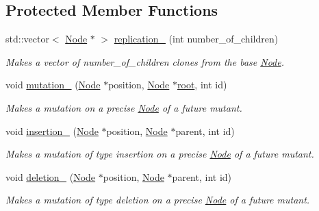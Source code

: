 \subsection*{Protected Member Functions}
\begin{DoxyCompactItemize}
\item 
\mbox{\label{classEvolution_aac3850387f35657c75c6deaf1e711538}} 
std\+::vector$<$ \hyperlink{classNode}{Node} $\ast$ $>$ \hyperlink{classEvolution_aac3850387f35657c75c6deaf1e711538}{replication\+\_\+} (int number\+\_\+of\+\_\+children)
\begin{DoxyCompactList}\small\item\em Makes a vector of number\+\_\+of\+\_\+children clones from the base \hyperlink{classNode}{Node}. \end{DoxyCompactList}\item 
\mbox{\label{classEvolution_ae4ec9688c4d948d9c31f29069804b0b0}} 
void \hyperlink{classEvolution_ae4ec9688c4d948d9c31f29069804b0b0}{mutation\+\_\+} (\hyperlink{classNode}{Node} $\ast$position, \hyperlink{classNode}{Node} $\ast$\hyperlink{classEvolution_a83182c1db463268e933cc0ca9c46d056}{root}, int id)
\begin{DoxyCompactList}\small\item\em Makes a mutation on a precise \hyperlink{classNode}{Node} of a future mutant. \end{DoxyCompactList}\item 
\mbox{\label{classEvolution_a436adadb0c98f7c12ae7be370b030a27}} 
void \hyperlink{classEvolution_a436adadb0c98f7c12ae7be370b030a27}{insertion\+\_\+} (\hyperlink{classNode}{Node} $\ast$position, \hyperlink{classNode}{Node} $\ast$parent, int id)
\begin{DoxyCompactList}\small\item\em Makes a mutation of type insertion on a precise \hyperlink{classNode}{Node} of a future mutant. \end{DoxyCompactList}\item 
\mbox{\label{classEvolution_a7832fd571fde0712015e5e50f5134abc}} 
void \hyperlink{classEvolution_a7832fd571fde0712015e5e50f5134abc}{deletion\+\_\+} (\hyperlink{classNode}{Node} $\ast$position, \hyperlink{classNode}{Node} $\ast$parent, int id)
\begin{DoxyCompactList}\small\item\em Makes a mutation of type deletion on a precise \hyperlink{classNode}{Node} of a future mutant. \end{DoxyCompactList}\item 

\end{DoxyCompactItemize}
